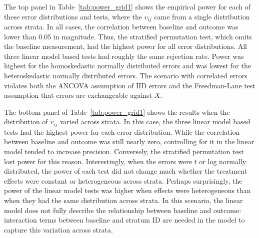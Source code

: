 \documentclass[12pt]{article}
\begin{document}
The top panel in Table~\ref{tab:power_grid1} shows the empirical power for each of these error distributions and tests, where the $v_{ij}$ came from a single distribution across strata.
In all cases, the correlation between baseline and outcome was lower than 0.05 in magnitude.
Thus, the stratified permutation test, which omits the baseline measurement, had the highest power for all error distributions.
All three linear model based tests had roughly the same rejection rate.
Power was highest for the homoskedastic normally distributed errors and was lowest for the heteroskedastic normally distributed errors.
The scenario with correlated errors violates both the ANCOVA assumption of IID errors and the Freedman-Lane test assumption that errors are exchangeable against $X$.

The bottom panel of Table~\ref{tab:power_grid1} shows the results when the distribution of $v_{ij}$ varied across strata.
In this case, the three linear model based tests had the highest power for each error distribution.
While the correlation between baseline and outcome was still nearly zero, controlling for it in the linear model tended to increase precision.
Conversely, the stratified permutation test lost power for this reason.
Interestingly, when the errors were $t$ or log normally distributed, the power of each test did not change much whether the treatment effects were constant or heterogeneous across strata.
Perhaps surprisingly, the power of the linear model tests was higher when effects were heterogeneous than when they had the same distribution across strata.
In this scenario, the linear model does not fully describe the relationship between baseline and outcome: 
interaction terms between baseline and stratum ID are needed in the model to capture this variation across strata.
\end{document}
